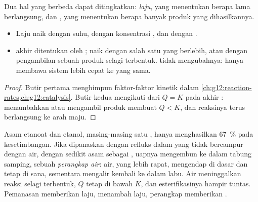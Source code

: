 Dua hal yang berbeda dapat ditingkatkan: \emph{laju}, yang menentukan
berapa lama  berlangsung, dan \emph{}, yang menentukan
berapa banyak produk yang dihasilkannya.

\begin{proposition}\label{prop:g12:synthesis-strategy:levers}
\begin{itemize}
  \item Laju naik dengan suhu, dengan konsentrasi , dan dengan
        .
  \item {} akhir  ditentukan oleh ;
          naik dengan salah satu 
        yang berlebih, atau dengan pengambilan sebuah produk selagi
        terbentuk.  tidak mengubahnya:  hanya membawa
        sistem lebih cepat ke  yang sama.
\end{itemize}
\end{proposition}

\begin{proof}
Butir pertama menghimpun faktor-faktor kinetik dalam
\cref{ch:g12:reaction-rates,ch:g12:catalysis}. Butir kedua mengikuti dari
$Q = K$ pada akhir : menambahkan  atau
mengambil produk membuat $Q < K$, dan reaksinya terus berlangsung ke
arah maju.
\end{proof}

\begin{example}\label{ex:g12:synthesis-strategy:trap}
Asam etanoat dan etanol, masing-masing satu , hanya menghasilkan
\qty{67}{\percent}  pada kesetimbangan. Jika  dipanaskan
dengan refluks dalam  yang tidak bercampur dengan air, dengan
sedikit asam sebagai , uapnya mengembun ke dalam tabung samping,
sebuah \emph{perangkap air}: air, yang lebih rapat, mengendap di dasar
dan tetap di sana, sementara  mengalir kembali ke dalam labu.
Air meninggalkan reaksi selagi terbentuk, $Q$ tetap di bawah $K$, dan
esterifikasinya hampir tuntas. Pemanasan memberikan laju, 
menambah laju, perangkap memberikan .
\end{example}

